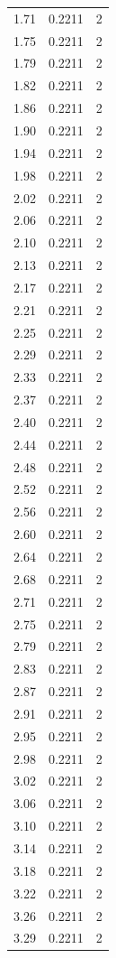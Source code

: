 \begin{longtable}{lrr}
  1.71 & 0.2211 & 2 \\
  1.75 & 0.2211 & 2 \\
  1.79 & 0.2211 & 2 \\
  1.82 & 0.2211 & 2 \\
  1.86 & 0.2211 & 2 \\
  1.90 & 0.2211 & 2 \\
  1.94 & 0.2211 & 2 \\
  1.98 & 0.2211 & 2 \\
  2.02 & 0.2211 & 2 \\
  2.06 & 0.2211 & 2 \\
  2.10 & 0.2211 & 2 \\
  2.13 & 0.2211 & 2 \\
  2.17 & 0.2211 & 2 \\
  2.21 & 0.2211 & 2 \\
  2.25 & 0.2211 & 2 \\
  2.29 & 0.2211 & 2 \\
  2.33 & 0.2211 & 2 \\
  2.37 & 0.2211 & 2 \\
  2.40 & 0.2211 & 2 \\
  2.44 & 0.2211 & 2 \\
  2.48 & 0.2211 & 2 \\
  2.52 & 0.2211 & 2 \\
  2.56 & 0.2211 & 2 \\
  2.60 & 0.2211 & 2 \\
  2.64 & 0.2211 & 2 \\
  2.68 & 0.2211 & 2 \\
  2.71 & 0.2211 & 2 \\
  2.75 & 0.2211 & 2 \\
  2.79 & 0.2211 & 2 \\
  2.83 & 0.2211 & 2 \\
  2.87 & 0.2211 & 2 \\
  2.91 & 0.2211 & 2 \\
  2.95 & 0.2211 & 2 \\
  2.98 & 0.2211 & 2 \\
  3.02 & 0.2211 & 2 \\
  3.06 & 0.2211 & 2 \\
  3.10 & 0.2211 & 2 \\
  3.14 & 0.2211 & 2 \\
  3.18 & 0.2211 & 2 \\
  3.22 & 0.2211 & 2 \\
  3.26 & 0.2211 & 2 \\
  3.29 & 0.2211 & 2 \\

\end{longtable}
